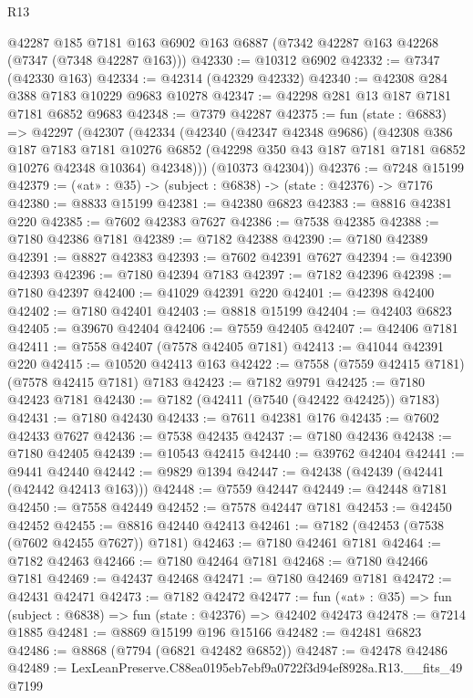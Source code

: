 \begin{lexlean}{R13}
\begin{coremodule}
    @42287
    @185
    @7181
    @163
    @6902
    @163
    @6887
    (@7342 @42287 @163 @42268 (@7347 (@7348 @42287 @163)))
@42330 := @10312 @6902
@42332 := @7347 (@42330 @163)
@42334 := @42314 (@42329 @42332)
@42340 := @42308 @284 @388 @7183 @10229 @9683 @10278
@42347 := @42298 @281 @13 @187 @7181 @7181 @6852 @9683
@42348 := @7379 @42287
@42375 := fun (state : @6883) =>
  @42297
    (@42307
      (@42334
        (@42340
          (@42347 @42348 @9686)
          (@42308
            @386
            @187
            @7183
            @7181
            @10276
            @6852
            (@42298 @350 @43 @187 @7181 @7181 @6852 @10276 @42348 @10364)
            @42348)))
      (@10373 @42304))
@42376 := @7248 @15199
@42379 := («at» : @35) -> (subject : @6838) -> (state : @42376) -> @7176
@42380 := @8833 @15199
@42381 := @42380 @6823
@42383 := @8816 @42381 @220
@42385 := @7602 @42383 @7627
@42386 := @7538 @42385
@42388 := @7180 @42386 @7181
@42389 := @7182 @42388
@42390 := @7180 @42389
@42391 := @8827 @42383
@42393 := @7602 @42391 @7627
@42394 := @42390 @42393
@42396 := @7180 @42394 @7183
@42397 := @7182 @42396
@42398 := @7180 @42397
@42400 := @41029 @42391 @220
@42401 := @42398 @42400
@42402 := @7180 @42401
@42403 := @8818 @15199
@42404 := @42403 @6823
@42405 := @39670 @42404
@42406 := @7559 @42405
@42407 := @42406 @7181
@42411 := @7558 @42407 (@7578 @42405 @7181)
@42413 := @41044 @42391 @220
@42415 := @10520 @42413 @163
@42422 := @7558 (@7559 @42415 @7181) (@7578 @42415 @7181) @7183
@42423 := @7182 @9791
@42425 := @7180 @42423 @7181
@42430 := @7182 (@42411 (@7540 (@42422 @42425)) @7183)
@42431 := @7180 @42430
@42433 := @7611 @42381 @176
@42435 := @7602 @42433 @7627
@42436 := @7538 @42435
@42437 := @7180 @42436
@42438 := @7180 @42405
@42439 := @10543 @42415
@42440 := @39762 @42404
@42441 := @9441 @42440
@42442 := @9829 @1394
@42447 := @42438 (@42439 (@42441 (@42442 @42413 @163)))
@42448 := @7559 @42447
@42449 := @42448 @7181
@42450 := @7558 @42449
@42452 := @7578 @42447 @7181
@42453 := @42450 @42452
@42455 := @8816 @42440 @42413
@42461 := @7182 (@42453 (@7538 (@7602 @42455 @7627)) @7181)
@42463 := @7180 @42461 @7181
@42464 := @7182 @42463
@42466 := @7180 @42464 @7181
@42468 := @7180 @42466 @7181
@42469 := @42437 @42468
@42471 := @7180 @42469 @7181
@42472 := @42431 @42471
@42473 := @7182 @42472
@42477 := fun («at» : @35) => fun (subject : @6838) => fun (state : @42376) => @42402 @42473
@42478 := @7214 @1885
@42481 := @8869 @15199 @196 @15166
@42482 := @42481 @6823
@42486 := @8868 (@7794 (@6821 @42482 @6852))
@42487 := @42478 @42486
@42489 := LexLeanPreserve.C88ea0195eb7ebf9a0722f3d94ef8928a.R13.__fits_49 @7199

\end{coremodule}
\end{lexlean}
